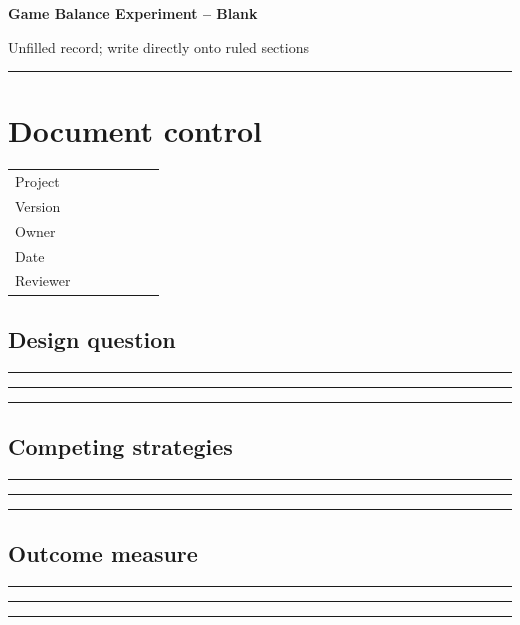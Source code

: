 \documentclass[11pt]{article}
\begin{document}
{\huge\bfseries\color{suiteblue} Game Balance Experiment -- Blank}\par
\vspace{0.15in}
{\normalsize\color{suitegray} Unfilled record; write directly onto ruled sections}\par
\vspace{0.15in}\hrule\vspace{0.15in}

\section{Document control}
\renewcommand{\arraystretch}{1.8}
\begin{tabularx}{\linewidth}{@{}p{0.30\linewidth}X@{}}\toprule
Project & \hrulefill\\ Version & \hrulefill\\ Owner & \hrulefill\\ Date & \hrulefill\\ Reviewer & \hrulefill\\ \bottomrule\end{tabularx}

\subsection{Design question}
\noindent\rule{\linewidth}{0.3pt}\par\vspace{0.18in}
\noindent\rule{\linewidth}{0.3pt}\par\vspace{0.18in}
\noindent\rule{\linewidth}{0.3pt}\par\vspace{0.14in}

\subsection{Competing strategies}
\noindent\rule{\linewidth}{0.3pt}\par\vspace{0.18in}
\noindent\rule{\linewidth}{0.3pt}\par\vspace{0.18in}
\noindent\rule{\linewidth}{0.3pt}\par\vspace{0.14in}

\subsection{Outcome measure}
\noindent\rule{\linewidth}{0.3pt}\par\vspace{0.18in}
\noindent\rule{\linewidth}{0.3pt}\par\vspace{0.18in}
\noindent\rule{\linewidth}{0.3pt}\par\vspace{0.14in}
\end{document}
